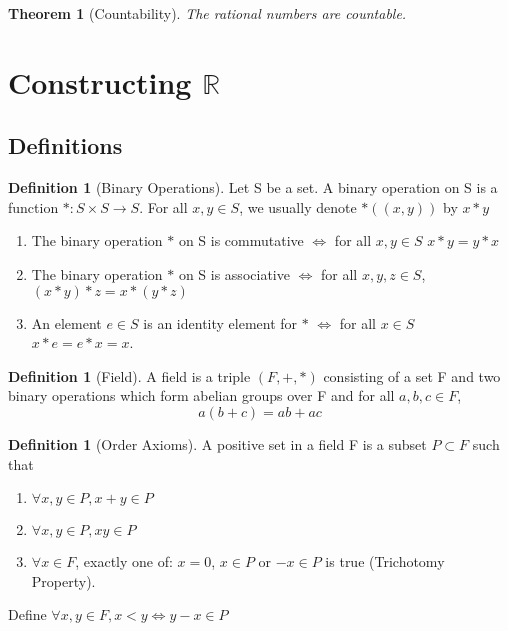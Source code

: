 \documentclass[12pt]{article}
\newtheorem*{thm*}{Theorem}
\theoremstyle{definition}
\newtheorem{defn}[thm]{Definition}
\theoremstyle{remark}
\numberwithin{equation}{section}
\newcommand\R{\mathbb R}    %
\begin{document}
\begin{thm*}[Countability]
        The rational numbers are countable.
\end{thm*}

\clearpage


\section{Constructing $\R$}



\subsection{Definitions}


\begin{defn}[Binary Operations]
        Let S be a set. A binary operation on S is a function $*:S\times S \rightarrow S$. For all $x,y \in S$, we usually denote $*((x,y))$ by $x*y$
        \begin{enumerate}
                \item The binary operation $*$ on S is commutative $\iff$ for all $x,y \in S$ $x*y=y*x$
                \item The binary operation $*$ on S is associative $\iff$ for all $x,y,z\in S$, $(x*y)*z=x*(y*z)$
                \item An element $e \in S$ is an identity element for $*$ $\iff$ for all $x \in S$ $x*e = e*x = x$.
        \end{enumerate}
\end{defn}


\begin{defn}[Field]
        A field is a triple $(F,+,*)$ consisting of a set F and two binary operations which form abelian groups over F and for all $a,b,c \in F$, $$a(b+c) = ab+ac$$
\end{defn}



\begin{defn}[Order Axioms]
        A positive set in a field F is a subset $P \subset F$ such that 
        \begin{enumerate}
                \item $\forall x,y \in P, x+y \in P$
                \item $\forall x,y \in P, xy \in P$
                \item $\forall x \in F$, exactly one of: $x = 0$, $x \in P$ or $-x \in P$ is true (Trichotomy Property).
        \end{enumerate}
        Define $\forall x,y \in F, x < y \iff y-x \in P$
\end{defn}
\end{document}

